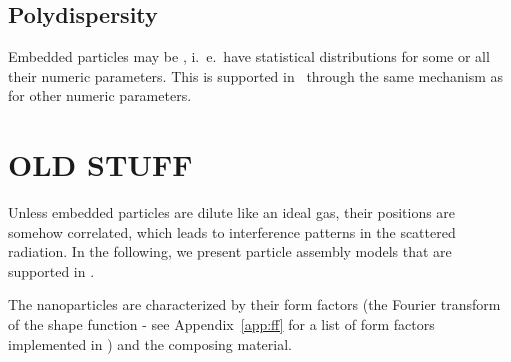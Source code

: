 
\subsection{Polydispersity}

%
%
%
%
Embedded particles may be , i.~e.\ have statistical distributions
for some or all their numeric parameters.
This is supported in \BornAgain\ through the same mechanism
as for other numeric parameters.




\section{OLD STUFF}

Unless embedded particles are dilute like an ideal gas,
their positions are somehow correlated,
which leads to interference patterns in the scattered radiation.
In the following,
we present particle assembly models that are supported in \BornAgain.


The nanoparticles are characterized by their form factors
(\idest the Fourier transform of the shape function - see Appendix~\ref{app:ff} for a list of form factors implemented in \BornAgain) and the composing material.



